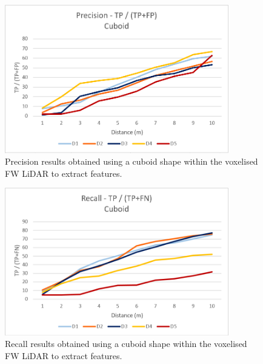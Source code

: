 \documentclass{subfiles}
\begin{document}
        \begin{figure} [h!]
        	\centering
        	\includegraphics[width=0.87\textwidth]{img/dead/results/Precision_Cuboid}
        	\caption[Precision results obtained using a cuboid shape]{Precision results obtained using a cuboid shape within the voxelised FW LiDAR to extract features. }
        	\label{fig:Precision_Cuboid}
        \end{figure}
    
        \begin{figure} [h!]
        	\centering
        	\includegraphics[width=0.87\textwidth]{img/dead/results/Recall_Cuboid}
        	\caption[Recall results obtained using a cuboid shape]{Recall results obtained using a cuboid shape within the voxelised FW LiDAR to extract features. }
        	\label{fig:Recall_Cuboid}
        \end{figure}
        
        \newpage
\end{document}
